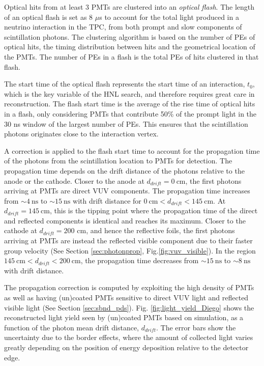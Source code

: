 Optical hits from at least 3 PMTs are clustered into an \textit{optical flash}.
The length of an optical flash is set as 8 $\mu$s to account for the total light produced in a neutrino interaction in the TPC, from both prompt and slow components of scintillation photons.
The clustering algorithm is based on the number of PEs of optical hits, the timing distribution between hits and the geometrical location of the PMTs.
The number of PEs in a flash is the total PEs of hits clustered in that flash. 

The start time of the optical flash represents the start time of an interaction, $t_0$, which is the key variable of the HNL search, and therefore requires great care in reconstruction.
The flash start time is the average of the rise time of optical hits in a flash, only considering PMTs that contribute 50\% of the prompt light in the 30 ns window of the largest number of PEs.
This ensures that the scintillation photons originates close to the interaction vertex.

A correction is applied to the flash start time to account for the propagation time of the photons from the scintillation location to PMTs for detection.
The propagation time depends on the drift distance of the photons relative to the anode or the cathode.
Closer to the anode at $d_{drift} = 0~\mathrm{cm}$, the first photons arriving at PMTs are direct VUV components.
The propagation time increases from $\sim4~\mathrm{ns}$ to $\sim15~\mathrm{ns}$ with drift distance for $0~\mathrm{cm} < d_{drift} < 145~\mathrm{cm}$.
At $d_{drift} = 145~\mathrm{cm}$, this is the tipping point where the propagation time of the direct and reflected components is identical and reaches its maximum.
Closer to the cathode at $d_{drift} = 200 $ cm, and hence the reflective foils, the first photons arriving at PMTs are instead the reflected visible component due to their faster group velocity (See Section \ref{sec:photonprop}, Fig.\ref{fig:vuv_visible}).
In the region $145~\mathrm{cm} < d_{drift} < 200~\mathrm{cm}$, the propagation time decreases from $\sim15~\mathrm{ns}$ to $\sim8~\mathrm{ns}$ with drift distance.

The propagation correction is computed by exploiting the high density of PMTs as well as having (un)coated PMTs sensitive to direct VUV light and reflected visible light (See Section \ref{sec:sbnd_pds}).
Fig. \ref{fig:light_yield_Diego} shows the reconstructed light yield seen by (un)coated PMTs based on simulation, as a function of the photon mean drift distance, $d_{drift}$.
The error bars show the uncertainty due to the border effects, where the amount of collected light varies greatly depending on the position of energy deposition relative to the detector edge.

